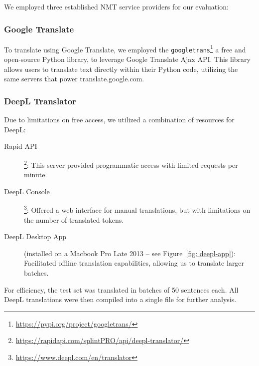 We employed three established NMT service providers for our evaluation:

\subsubsection{Google Translate}

To translate using Google Translate, we employed the \texttt{googletrans}\footnote{\href{https://pypi.org/project/googletrans/}{https://pypi.org/project/googletrans/}} a free and open-source Python library, to leverage Google Translate Ajax API. This library allows users to translate text directly within their Python code, utilizing the same servers that power translate.google.com.

\subsubsection{DeepL Translator}

Due to limitations on free access, we utilized a combination of resources for DeepL:

\begin{description}
    \item[\hspace{=2em}Rapid API]\footnote{\href{https://rapidapi.com/splintPRO/api/deepl-translator/}{https://rapidapi.com/splintPRO/api/deepl-translator/}}: This server provided programmatic access with limited requests per minute.
    \item[\hspace{=2em}DeepL Console]\footnote{\href{https://www.deepl.com/en/translator}{https://www.deepl.com/en/translator}}: Offered a web interface for manual translations, but with limitations on the number of translated tokens.
    \item[\hspace{=2em}DeepL Desktop App] (installed on a Macbook Pro Late 2013 -- see Figure~\ref{fig: deepl-app}): Facilitated offline translation capabilities, allowing us to translate larger batches.
\end{description}



For efficiency, the test set was translated in batches of 50 sentences each. All DeepL translations were then compiled into a single file for further analysis. 

